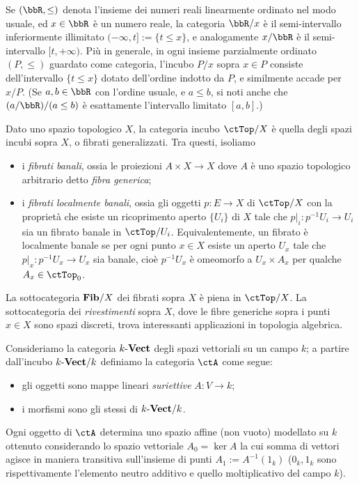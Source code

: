 \begin{example}[Intervalli]\label{ex_pos_slices}
	Se \((\bbR,\le)\) denota l'insieme dei numeri reali linearmente ordinato nel modo usuale, ed \(x\in\bbR\) è un numero reale, la categoria \(\bbR/x\) è il semi-intervallo inferiormente illimitato \((-\infty,t]:=\{t\le x\}\), e analogamente \(x/\bbR\) è il semi-intervallo \([t,+\infty)\). Più in generale, in ogni insieme parzialmente ordinato \((P,\le)\) guardato come categoria, l'incubo \(P/x\) sopra \(x\in P\) consiste dell'intervallo \(\{t\le x\}\) dotato dell'ordine indotto da \(P\), e similmente accade per \(x/P\). (Se \(a,b\in\bbR\) con l'ordine usuale, e \(a\le b\), si noti anche che \((a/\bbR)/(a\le b)\) è esattamente l'intervallo limitato \([a,b]\).)
\end{example}
\begin{example}\label{ex_fibrati_rivestimenti}
	Dato uno spazio topologico \(X\), la categoria incubo \(\ctTop/X\) è quella degli spazi incubi sopra \(X\), o fibrati generalizzati. Tra questi, isoliamo
	\begin{itemize}
		\item i \emph{fibrati banali}, ossia le proiezioni \(A\times X \to X\) dove \(A\) è uno spazio topologico arbitrario detto \emph{fibra generica};
		\item i \emph{fibrati localmente banali}, ossia gli oggetti \(p : E\to X\) di \(\ctTop/X\) con la proprietà che esiste un ricoprimento aperto \(\{U_i\}\) di \(X\) tale che \(p|_i : p^{-1}U_i\to U_i\) sia un fibrato banale in \(\ctTop/U_i\). Equivalentemente, un fibrato è localmente banale se per ogni punto \(x\in X\) esiste un aperto \(U_x\) tale che \(p|_x : p^{-1}U_x\to U_x\) sia banale, cioè \(p^{-1}U_x\) è omeomorfo a \(U_x\times A_x\) per qualche \(A_x\in\ctTop_0\).
	\end{itemize}
	La sottocategoria \(\mathbf{Fib}/X\) dei fibrati sopra \(X\) è piena in \(\ctTop/X\). La sottocategoria dei \emph{rivestimenti} sopra \(X\), dove le fibre generiche sopra i punti \(x\in X\) sono spazi discreti, trova interessanti applicazioni in topologia algebrica.
\end{example}
\begin{example}\label{ex_affini}
	Consideriamo la categoria \(\ctVect[k]\) degli spazi vettoriali su un campo \(k\); a partire dall'incubo \(\ctVect[k]/k\) definiamo la categoria \(\ctA\) come segue:
	\begin{itemize}
		\item gli oggetti sono mappe lineari \emph{suriettive} \(A : V\to k\);
		\item i morfismi sono gli stessi di \(\ctVect[k]/k\).
	\end{itemize}
	Ogni oggetto di \(\ctA\) determina uno spazio affine (non vuoto) modellato su \(k\) ottenuto considerando lo spazio vettoriale \(A_0 = \ker A\) la cui somma di vettori agisce in maniera transitiva sull'insieme di punti \(A_1 := A^{-1}(1_k)\) (\(0_k,1_k\) sono rispettivamente l'elemento neutro additivo e quello moltiplicativo del campo \(k\)).
\end{example}
